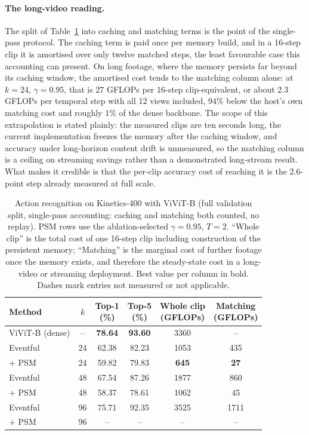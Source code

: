 \paragraph{The long-video reading.}
The split of Table~\ref{tab:k400} into caching and matching terms is the
point of the single-pass protocol. The caching term is paid once per
memory build, and in a 16-step clip it is amortised over only twelve
matched steps, the least favourable case this accounting can present. On
long footage, where the memory persists far beyond its caching window,
the amortised cost tends to
the matching column alone: at $k = 24$, $\gamma = 0.95$, that is $27$
GFLOPs per 16-step clip-equivalent, or about $2.3$ GFLOPs per temporal
step with all 12 views included, $94\%$ below the host's own matching
cost and roughly $1\%$ of the dense backbone. The scope of this
extrapolation is stated plainly: the measured clips are ten seconds
long, the current implementation freezes the memory after the caching
window, and accuracy under long-horizon content drift is unmeasured, so
the matching column is a ceiling on streaming savings rather than a
demonstrated long-stream result. What makes it credible is that the
per-clip accuracy cost of reaching it is the $2.6$-point step already
measured at full scale.

\begin{table}[t]
\centering
\footnotesize
\setlength{\tabcolsep}{4pt}
\begin{tabular}{lccccc}
\toprule
Method & $k$ & \makecell{Top-1\\(\%)} & \makecell{Top-5\\(\%)} &
\makecell{Whole clip\\(GFLOPs)} & \makecell{Matching\\(GFLOPs)} \\
\midrule
ViViT-B (dense)    & --  & \textbf{78.64} & \textbf{93.60} & 3360 & -- \\
\midrule
Eventful           & 24  & 62.38 & 82.23 & 1053 & 435 \\
\;\;$+$ PSM   & 24  & 59.82 & 79.83 & \textbf{645} & \textbf{27} \\
\midrule
Eventful           & 48  & 67.54 & 87.26 & 1877 & 860 \\
\;\;$+$ PSM   & 48  & 58.37 & 78.61 & 1062 & 45 \\
\midrule
Eventful           & 96  & 75.71 & 92.35 & 3525 & 1711 \\
\;\;$+$ PSM        & 96  & --    & --    & --   & --   \\
\bottomrule
\end{tabular}
\caption{Action recognition on Kinetics-400 with ViViT-B (full
validation split, single-pass accounting: caching and matching both
counted, no replay). PSM rows use the ablation-selected $\gamma = 0.95$,
$T = 2$. ``Whole clip'' is the total cost of one 16-step clip including
construction of the persistent memory; ``Matching'' is the marginal cost
of further footage once the memory exists, and therefore the
steady-state cost in a long-video or streaming deployment. Best value
per column in bold. Dashes mark entries not measured or not
applicable.}
\label{tab:k400}
\end{table}


